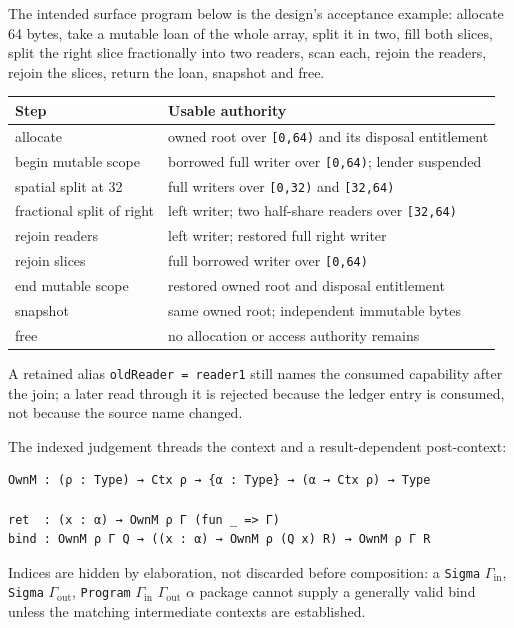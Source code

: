 \documentclass[10pt,a4paper]{article}
\begin{document}
The intended surface program below is the design's acceptance example: allocate
64 bytes, take a mutable loan of the whole array, split it in two, fill both
slices, split the right slice fractionally into two readers, scan each, rejoin
the readers, rejoin the slices, return the loan, snapshot and free.

\begin{center}
\begin{tabular}{@{}ll@{}}
\toprule
Step & Usable authority \\
\midrule
allocate & owned root over \texttt{[0,64)} and its disposal entitlement \\
begin mutable scope & borrowed full writer over \texttt{[0,64)}; lender suspended \\
spatial split at 32 & full writers over \texttt{[0,32)} and \texttt{[32,64)} \\
fractional split of right & left writer; two half-share readers over \texttt{[32,64)} \\
rejoin readers & left writer; restored full right writer \\
rejoin slices & full borrowed writer over \texttt{[0,64)} \\
end mutable scope & restored owned root and disposal entitlement \\
snapshot & same owned root; independent immutable bytes \\
free & no allocation or access authority remains \\
\bottomrule
\end{tabular}
\end{center}

A retained alias \texttt{oldReader = reader1} still names the consumed capability
after the join; a later read through it is rejected because the ledger entry is
consumed, not because the source name changed.

The indexed judgement threads the context and a result-dependent post-context:

\begin{lstlisting}[caption={The design's computation type, schematic.}]
OwnM : (ρ : Type) → Ctx ρ → {α : Type} → (α → Ctx ρ) → Type

ret  : (x : α) → OwnM ρ Γ (fun _ => Γ)
bind : OwnM ρ Γ Q → ((x : α) → OwnM ρ (Q x) R) → OwnM ρ Γ R
\end{lstlisting}

Indices are hidden by elaboration, not discarded before composition: a
\texttt{Sigma} $\Gamma_{\mathrm{in}}$, \texttt{Sigma} $\Gamma_{\mathrm{out}}$, \texttt{Program} $\Gamma_{\mathrm{in}}$ $\Gamma_{\mathrm{out}}$ $\alpha$ package cannot supply a
generally valid bind unless the matching intermediate contexts are established.
\end{document}
